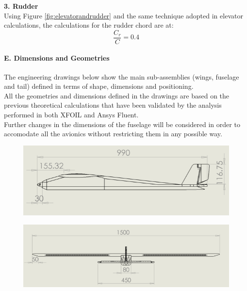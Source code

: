 \documentclass[12pt]{article}
\begin{document}
\noindent \textbf{3. Rudder} \\
\noindent Using Figure \ref{fig:elevatorandrudder} and the same technique adopted in elevator calculations, the calculations for the rudder chord are at: \\

\begin{equation} \label{eq}
\frac{C_r}{C}=0.4
\end{equation}

\paragraph{E. Dimensions and Geometries} The engineering drawings below show the main sub-assemblies (wings, fuselage and tail) defined in terms of shape, dimensions and positioning. \\

\noindent All the geometries and dimensions defined in the drawings are based on the previous theoretical calculations that have been validated by the analysis performed in both XFOIL and Ansys Fluent. \\

\noindent Further changes in the dimensions of the fuselage will be considered in order to accomodate all the avionics without restricting them in any possible way. \\

\begin{figure}[h!]
    \includegraphics[width=14.5cm, scale=1]{drawing2.png}
\end{figure}

\begin{figure}[h!]
    \includegraphics[width=14.5cm, scale=1]{drawing3.png}
\end{figure}
\end{document}
